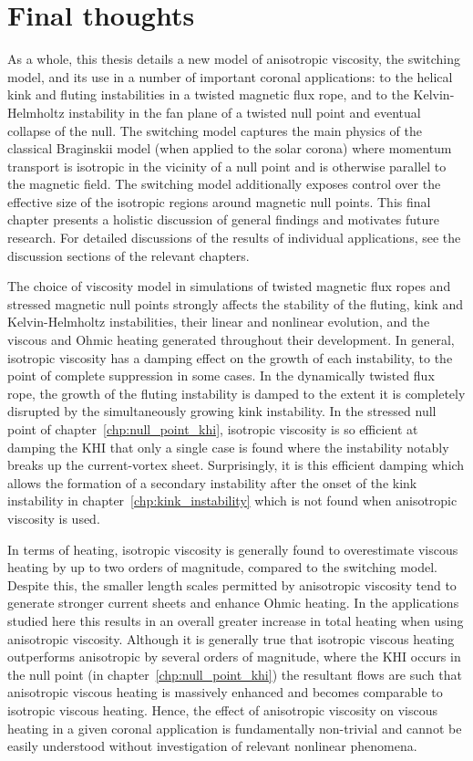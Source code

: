 \chapter{Final thoughts}

\label{chp:summary}


As a whole, this thesis details a new model of anisotropic viscosity, the switching model, and its use in a number of important coronal applications: to the helical kink and fluting instabilities in a twisted magnetic flux rope, and to the Kelvin-Helmholtz instability in the fan plane of a twisted null point and eventual collapse of the null. The switching model captures the main physics of the classical Braginskii model (when applied to the solar corona) where momentum transport is isotropic in the vicinity of a null point and is otherwise parallel to the magnetic field. The switching model additionally exposes control over the effective size of the isotropic regions around magnetic null points. This final chapter presents a holistic discussion of general findings and motivates future research. For detailed discussions of the results of individual applications, see the discussion sections of the relevant chapters.

The choice of viscosity model in simulations of twisted magnetic flux ropes and stressed magnetic null points strongly affects the stability of the fluting, kink and Kelvin-Helmholtz instabilities, their linear and nonlinear evolution, and the viscous and Ohmic heating generated throughout their development. In general, isotropic viscosity has a damping effect on the growth of each instability, to the point of complete suppression in some cases. In the dynamically twisted flux rope, the growth of the fluting instability is damped to the extent it is completely disrupted by the simultaneously growing kink instability. In the stressed null point of chapter~\ref{chp:null_point_khi}, isotropic viscosity is so efficient at damping the KHI that only a single case is found where the instability notably breaks up the current-vortex sheet. Surprisingly, it is this efficient damping which allows the formation of a secondary instability after the onset of the kink instability in chapter~\ref{chp:kink_instability} which is not found when anisotropic viscosity is used.

In terms of heating, isotropic viscosity is generally found to overestimate viscous heating by up to two orders of magnitude, compared to the switching model. Despite this, the smaller length scales permitted by anisotropic viscosity tend to generate stronger current sheets and enhance Ohmic heating. In the applications studied here this results in an overall greater increase in total heating when using anisotropic viscosity. Although it is generally true that isotropic viscous heating outperforms anisotropic by several orders of magnitude, where the KHI occurs in the null point (in chapter~\ref{chp:null_point_khi}) the resultant flows are such that anisotropic viscous heating is massively enhanced and becomes comparable to isotropic viscous heating. Hence, the effect of anisotropic viscosity on viscous heating in a given coronal application is fundamentally non-trivial and cannot be easily understood without investigation of relevant nonlinear phenomena.

